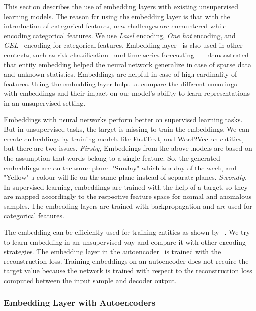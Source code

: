 \documentclass{article}
\begin{document}
This section describes the use of embedding layers with existing unsupervised learning models. The reason for using the embedding layer is that with the introduction of categorical features, new challenges are encountered while encoding categorical features. We use \textit{Label} encoding, \textit{One hot} encoding, and \textit{GEL}~\citep{gel} encoding for categorical features. Embedding layer~\citep{embed3, entityembed}  is also used in other contexts, such as risk classification~\citep{embed1}  and time series forecasting~\citep{embed2}. ~\citep{entityembed} demonstrated that entity embedding helped the neural network generalize in case of sparse data and unknown statistics. Embeddings are helpful in case of high cardinality of features. Using the embedding layer helps us compare the different encodings with embeddings and their impact on our model’s ability to learn representations in an unsupervised setting. 

Embeddings with neural networks perform better on supervised learning tasks. But in unsupervised tasks, the target is missing to train the embeddings. 
We can create embeddings by training models like FastText, and Word2Vec on entities, but there are two issues. \textit{Firstly}, Embeddings from the above models are based on the assumption that words belong to a single feature. So, the generated embeddings are on the same plane. "Sunday" which is a day of the week, and "Yellow" a colour will lie on the same plane instead of separate planes. \textit{Secondly}, 
In supervised learning, embeddings are trained with the help of a target, so they are mapped accordingly to the respective feature space for normal and anomalous samples. The embedding layers are trained with backpropagation and are used for categorical features.

The embedding can be efficiently used for training entities as shown by ~\citep{entityembed}. We try to learn embedding in an unsupervised way and compare it with other encoding strategies. The embedding layer in the autoencoder~\citep{autoembedder} is trained with the reconstruction loss. Training embeddings on an autoencoder does not require the target value because the network is trained with respect to the reconstruction loss computed between the input sample and decoder output.



\subsubsection{Embedding Layer with Autoencoders}
\end{document}
